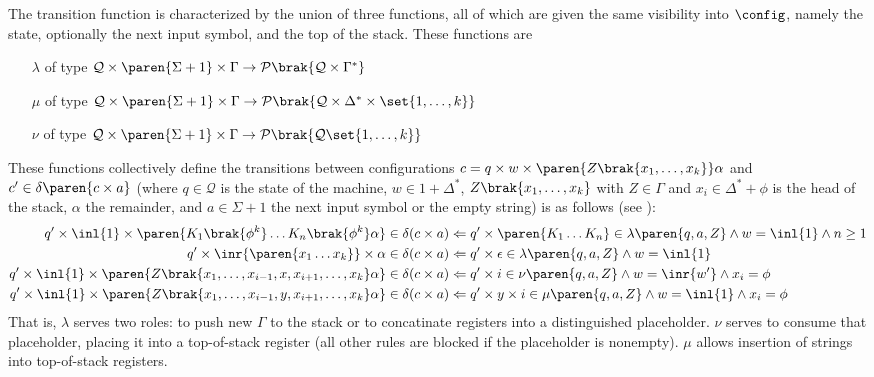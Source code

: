 The transition function is characterized by the union of three functions,
all of which are given the same visibility into $\config$, namely the state,
optionally the next input symbol, and the top of the stack.  These functions
are
%
\begin{itemize}
%
	\item[$\lambda$] of type $\mathcal{Q} \times \paren{\Sigma + 1} \times
	\Gamma \to \mathcal{P}\brak{ \mathcal{Q} \times \Gamma^* }$
%
	\item[$\mu$] of type $\mathcal{Q} \times \paren{\Sigma + 1} \times
	\Gamma \to \mathcal{P}\brak{ \mathcal{Q} \times \Delta^* \times
	\set{1,\ldots,k} }$
%
	\item[$\nu$] of type $\mathcal{Q} \times \paren{\Sigma + 1} \times
	\Gamma \to \mathcal{P}\brak{ \mathcal{Q} \set{1,\ldots,k} }$
%
\end{itemize}
%
These functions collectively define the transitions between configurations
$c = q \times w \times \paren{Z\brak{x_1,\ldots,x_k}}\alpha$ and $c' \in
\delta\paren{c \times a}$ (where $q \in \mathcal{Q}$ is the state of the
machine, $w \in 1 + \Delta^*$, $Z\brak{x_1,\ldots,x_k}$ with $Z \in \Gamma$
and $x_i \in \Delta^* + \phi$ is the head of the stack, $\alpha$ the
remainder, and $a \in \Sigma + 1$ the next input symbol or the empty string)
is as follows (see \cite[p.  48]{aho:pa}):
%
\begin{align*}
	q'\times \inl{1} \times \paren{K_1\brak{\phi^k} \ldots K_n\brak{\phi^k} \alpha} \in\delta (c \times a)
%
	&\Leftarrow q' \times \paren{K_1 \ldots K_n} \in \lambda\paren{q,a, Z} \wedge w = \inl{1} \wedge n \ge 1 \\
%
	q'\times \inr{\paren{x_1 \ldots x_k}} \times \alpha \in \delta (c \times a)
%
	&\Leftarrow q' \times \epsilon \in \lambda\paren{q,a, Z} \wedge w = \inl{1} \\
%
	q'\times \inl{1} \times \paren{Z\brak{x_1,\ldots,x_{i-1},x,x_{i+1},\ldots,x_k}\alpha} \in\delta (c \times a)
%
	&\Leftarrow q' \times i \in \nu\paren{q,a, Z} \wedge w = \inr{w'} \wedge x_i = \phi \\
%
	q'\times \inl{1} \times \paren{Z\brak{x_1,\ldots,x_{i-1},y,x_{i+1},\ldots,x_k}\alpha} \in\delta (c \times a)
%
	&\Leftarrow q' \times y \times i \in \mu\paren{q,a, Z} \wedge w = \inl{1} \wedge x_i = \phi
%
\end{align*}
%
That is, $\lambda$ serves two roles: to push new $\Gamma$ to the stack or to
concatinate registers into a distinguished placeholder.  $\nu$ serves to
consume that placeholder, placing it into a top-of-stack register (all other
rules are blocked if the placeholder is nonempty).  $\mu$ allows insertion
of strings into top-of-stack registers.
